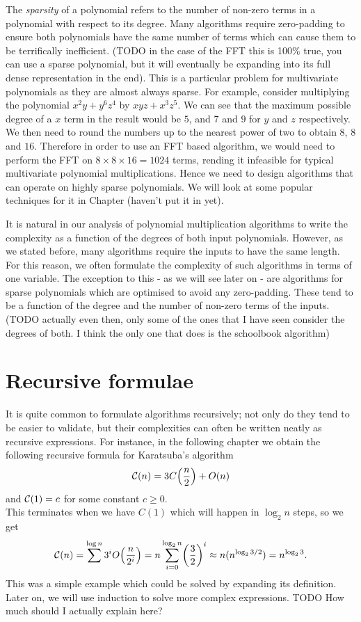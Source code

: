 The \emph{sparsity} of a polynomial refers to the number of non-zero terms in a polynomial with respect to its degree. Many algorithms require zero-padding to ensure both polynomials have the same number of terms which can cause them to be terrifically inefficient. (TODO in the case of the FFT this is 100\% true, you can use a sparse polynomial, but it will eventually be expanding into its full dense representation in the end). This is a particular problem for multivariate polynomials as they are almost always sparse. For example, consider multiplying the polynomial $x^2y + y^6z^4$ by $xyz + x^3z^5$. We can see that the maximum possible degree of a $x$ term in the result would be $5$, and $7$ and $9$ for $y$ and $z$ respectively. We then need to round the numbers up to the nearest power of two to obtain $8$, $8$ and $16$. Therefore in order to use an FFT based algorithm, we would need to perform the FFT on $8 \times 8 \times 16 = 1024$ terms, rending it infeasible for typical multivariate polynomial multiplications. Hence we need to design algorithms that can operate on highly sparse polynomials. We will look at some popular techniques for it in Chapter (haven't put it in yet).

It is natural in our analysis of polynomial multiplication algorithms to write the complexity as a function of the degrees of both input polynomials. However, as we stated before, many algorithms require the inputs to have the same length. For this reason, we often formulate the complexity of such algorithms in terms of one variable. The exception to this - as we will see later on - are algorithms for sparse polynomials which are optimised to avoid any zero-padding. These tend to be a function of the degree and the number of non-zero terms of the inputs.
(TODO actually even then, only some of the ones that I have seen consider the degrees of both. I think the only one that does is the schoolbook algorithm)

\section{Recursive formulae}%
\label{sec:Recursive forumulae}

It is quite common to formulate algorithms recursively; not only do they tend to be easier to validate, but their complexities can often be written neatly as recursive expressions. For instance, in the following chapter we obtain the following recursive formula for Karatsuba's algorithm
\[
    \M{C}(n) = 3C\bb{\frac{n}{2}} + O(n)
\]
and $\mathcal C(1) = c$ for some constant $c \ge 0$.\\
This terminates when we have $C(1)$ which will happen in $\log_2 n$ steps, so we get
\[
    \M{C}(n) = \sum^{\log n} 3^i O\bb{\frac{n}{2^i}} = n\sum^{\log_2 n}_{i=0} \bb{\frac{3}{2}}^i \approx n(n^{\log_2 3/2}) = n^{\log_2 3}.
\]
This was a simple example which could be solved by expanding its definition. Later on, we will use induction to solve more complex expressions.
TODO How much should I actually explain here?

